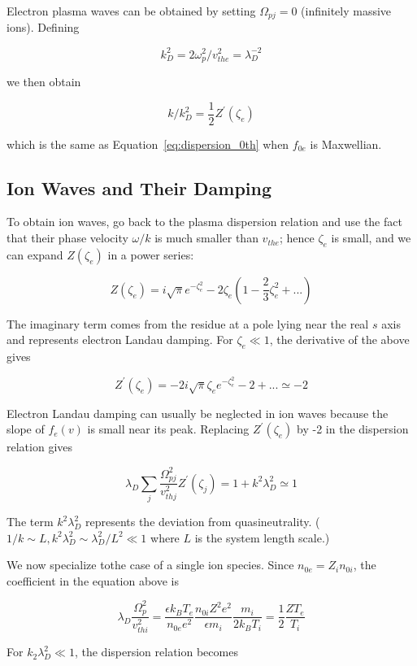\documentclass[
  notoc %
]{tufte-book}
\begin{document}
Electron plasma waves can be obtained by setting \(\Omega_{pj}=0\)
(infinitely massive ions). Defining

\[
k_D^2 = 2\omega_p^2/v_{the}^2 = \lambda_D^{-2}
\]

we then obtain

\[
k/k_D^2 = \frac{1}{2}Z^\prime(\zeta_e)
\]

which is the same as Equation~\ref{eq:dispersion_0th} when \(f_{0e}\) is
Maxwellian.

\hypertarget{ion-waves-and-their-damping}{%
\subsection{Ion Waves and Their
Damping}\label{ion-waves-and-their-damping}}

To obtain ion waves, go back to the plasma dispersion relation and use
the fact that their phase velocity \(\omega/k\) is much smaller than
\(v_{the}\); hence \(\zeta_e\) is small, and we can expand
\(Z(\zeta_e)\) in a power series:

\[
Z(\zeta_e) = i\sqrt{\pi}e^{-\zeta_e^2} - 2\zeta_e(1-\frac{2}{3}\zeta_e^2 + ...)
\]

The imaginary term comes from the residue at a pole lying near the real
\(s\) axis and represents electron Landau damping. For
\(\zeta_e \ll 1\), the derivative of the above gives

\[
Z^\prime(\zeta_e) = -2i\sqrt{\pi}\zeta_e e^{-\zeta_e^2} - 2 + ... \simeq -2
\]

Electron Landau damping can usually be neglected in ion waves because
the slope of \(f_e(v)\) is small near its peak. Replacing
\(Z^\prime(\zeta_e)\) by -2 in the dispersion relation gives

\[
\lambda_D\sum_j \frac{\Omega_{pj}^2}{v_{thj}^2}Z^\prime(\zeta_j) = 1+k^2\lambda_D^2 \simeq 1
\]

The term \(k^2\lambda_D^2\) represents the deviation from
quasineutrality. (\(1/k\sim L,k^2\lambda_D^2 \sim\lambda_D^2/L^2\ll 1\)
where \(L\) is the system length scale.)

We now specialize tothe case of a single ion species. Since
\(n_{0e}=Z_in_{0i}\), the coefficient in the equation above is

\[
\lambda_D\frac{\Omega_{p}^2}{v_{thi}^2}=\frac{\epsilon k_B T_e}{n_{0e}e^2}\frac{n_{0i}Z^2e^2}{\epsilon m_i}\frac{m_i}{2k_B T_i} = \frac{1}{2}\frac{ZT_e}{T_i}
\]

For \(k_2\lambda_D^2\ll 1\), the dispersion relation becomes
\end{document}
